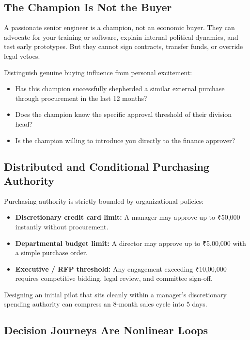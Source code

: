 \subsection{The Champion Is Not the Buyer}

A passionate senior engineer is a champion, not an economic buyer. They can advocate for your training or software, explain internal political dynamics, and test early prototypes. But they cannot sign contracts, transfer funds, or override legal vetoes.

Distinguish genuine buying influence from personal excitement:
\begin{itemize}[leftmargin=1.2em,itemsep=0.2ex]
  \item Has this champion successfully shepherded a similar external purchase through procurement in the last 12 months?
  \item Does the champion know the specific approval threshold of their division head?
  \item Is the champion willing to introduce you directly to the finance approver?
\end{itemize}

\subsection{Distributed and Conditional Purchasing Authority}

Purchasing authority is strictly bounded by organizational policies:
\begin{itemize}[leftmargin=1.2em,itemsep=0.2ex]
  \item \textbf{Discretionary credit card limit:} A manager may approve up to ₹50,000 instantly without procurement.
  \item \textbf{Departmental budget limit:} A director may approve up to ₹5,00,000 with a simple purchase order.
  \item \textbf{Executive / RFP threshold:} Any engagement exceeding ₹10,00,000 requires competitive bidding, legal review, and committee sign-off.
\end{itemize}
Designing an initial pilot that sits cleanly within a manager's discretionary spending authority can compress an 8-month sales cycle into 5 days.

\subsection{Decision Journeys Are Nonlinear Loops}

